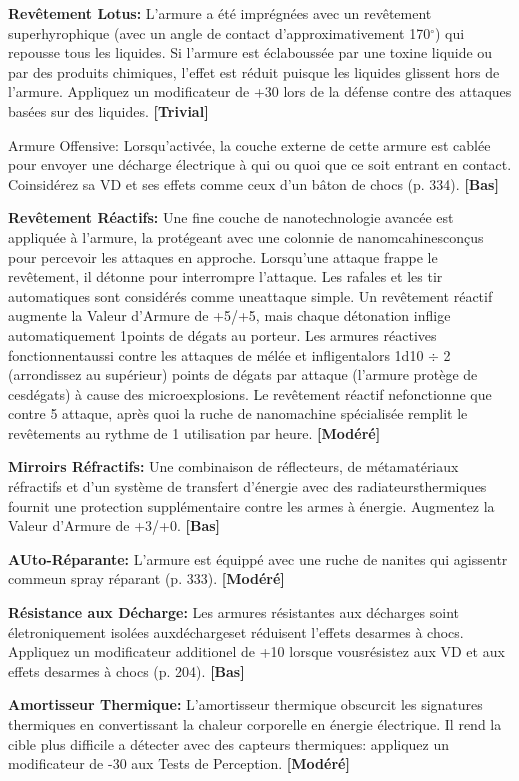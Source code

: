 {{\textbf{Revêtement Lotus:} L'armure a été imprégnées avec un revêtement superhyrophique (avec un angle de contact d'approximativement 170$^{\circ}$) qui repousse tous les liquides. Si l'armure est éclaboussée par une toxine liquide ou par des produits chimiques, l'effet est réduit puisque les liquides glissent hors de l'armure. Appliquez un modificateur de +30 lors de la défense contre des attaques basées sur des liquides. \textbf{[Trivial]} 

Armure Offensive: Lorsqu'activée, la couche externe de cette armure est cablée pour envoyer une décharge électrique à qui ou quoi que ce soit entrant en contact. Coinsidérez sa VD et ses effets comme ceux d'un bâton de chocs (p. 334). \textbf{[Bas]} 

\textbf{Revêtement Réactifs:} Une fine couche de nanotechnologie avancée est appliquée à l'armure, la protégeant avec une colonnie de nanomcahinesconçus pour percevoir les attaques en approche. Lorsqu'une attaque frappe le revêtement, il détonne pour interrompre l'attaque. Les rafales et les tir automatiques sont considérés comme uneattaque simple. Un revêtement réactif augmente la Valeur d'Armure de +5/+5, mais chaque détonation inflige automatiquement 1points de dégats au porteur. Les armures réactives fonctionnentaussi contre les attaques de mélée et infligentalors 1d10 $\div$ 2 (arrondissez au supérieur) points de dégats par attaque (l'armure protège de cesdégats) à cause des microexplosions. Le revêtement réactif nefonctionne que contre 5 attaque, après quoi la ruche de nanomachine spécialisée remplit le revêtements au rythme de 1 utilisation par heure. \textbf{[Modéré]} 

\textbf{Mirroirs Réfractifs:} Une combinaison de réflecteurs, de métamatériaux réfractifs et d'un système de transfert d'énergie avec des radiateursthermiques fournit une protection supplémentaire contre les armes à énergie. Augmentez la Valeur d'Armure de +3/+0. \textbf{[Bas]} 

\textbf{AUto-Réparante:} L'armure est équippé avec une ruche de nanites qui agissentr commeun spray réparant (p. 333). \textbf{[Modéré]} 

\textbf{Résistance aux Décharge:} Les armures résistantes aux décharges soint életroniquement isolées auxdéchargeset réduisent l'effets desarmes à chocs. Appliquez un modificateur additionel de +10 lorsque vousrésistez aux VD et aux effets desarmes à chocs (p. 204). \textbf{[Bas]} 

\textbf{Amortisseur Thermique:} L'amortisseur thermique obscurcit les signatures thermiques en convertissant la chaleur corporelle en énergie électrique. Il rend la cible plus difficile a détecter avec des capteurs thermiques: appliquez un modificateur de -30 aux Tests de Perception. \textbf{[Modéré]} 

}}
